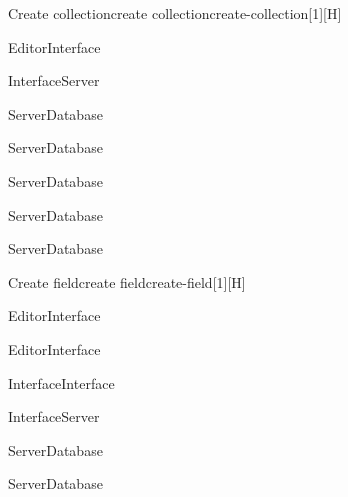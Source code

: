 \begin{toexclude}
\begin{sdfig}{Create collection}{create collection}{create-collection}[1][H]
  \begin{seqdigauth}[Editor]
    \begin{umlcall}[op={Create collection},return=Ok]{Editor}{Interface}
      \begin{umlcall}[op={Create collection},return=Ok]{Interface}{Server}
        \begin{umlcall}[op={Create collection}]{Server}{Database}
          \begin{umlcall}[op={Create field}]{Server}{Database}
          \end{umlcall}
          \begin{umlcall}[op={Create view}]{Server}{Database}
          \end{umlcall}
          \begin{umlcall}[op={Create document}]{Server}{Database}
            \begin{umlcall}[op={Create block}]{Server}{Database}
            \end{umlcall}
          \end{umlcall}
        \end{umlcall}
      \end{umlcall}
    \end{umlcall}
  \end{seqdigauth}
\end{sdfig}


\begin{sdfig}{Create field}{create field}{create-field}[1][H]

  \begin{seqdigauth}[Editor]
    \begin{umlcall}[op={Create field},return={Select type}]{Editor}{Interface}
    \end{umlcall}

    \begin{umlcall}[op={Select type},return=Ok]{Editor}{Interface}
      \begin{umlcall}[op={Update local state}]{Interface}{Interface}
      \end{umlcall}
      \begin{umlcall}[op={Create field},return=Ok]{Interface}{Server}
        \begin{umlcall}[op={Create field}]{Server}{Database}
          \begin{umlcall}[op={Create blocks}]{Server}{Database}
          \end{umlcall}
        \end{umlcall}
      \end{umlcall}
    \end{umlcall}
  \end{seqdigauth}
\end{sdfig}


\end{toexclude}

